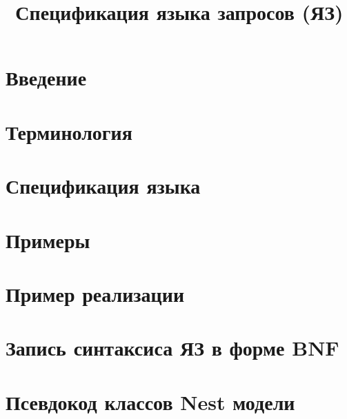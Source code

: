 \documentclass[a4paper,12pt]{article}
\title{Спецификация языка запросов (ЯЗ)}
\date{}
\begin{document}
\maketitle
\tableofcontents

\section{Введение}\label{intro}


\section{Терминология}\label{term}


\section{Спецификация языка}\label{spec}


\section{Примеры}\label{examples}


\section{Пример реализации}\label{impl}


\appendix
\section{Запись синтаксиса ЯЗ в форме BNF}\label{oqlite_bnf}

\section{Псевдокод классов Nest модели}\label{son_code}

\end{document}
